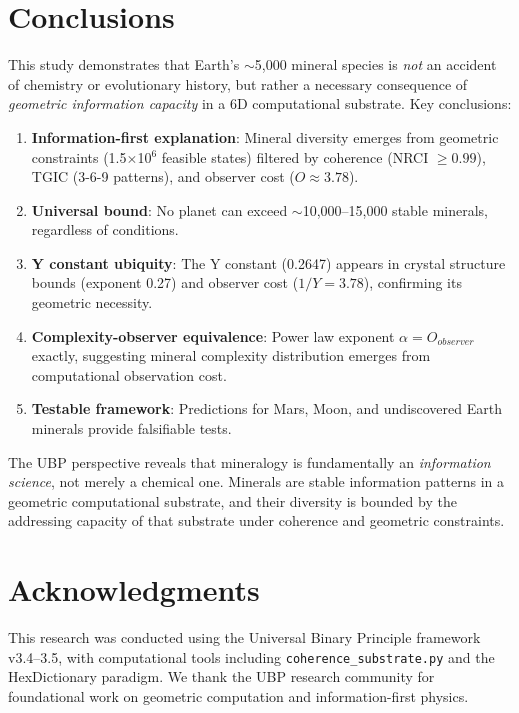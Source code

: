 \documentclass[11pt,a4paper]{article}
\begin{document}
\section{Conclusions}

This study demonstrates that Earth's $\sim$5,000 mineral species is \textit{not} an accident of chemistry or evolutionary history, but rather a necessary consequence of \textit{geometric information capacity} in a 6D computational substrate. Key conclusions:

\begin{enumerate}
\item \textbf{Information-first explanation}: Mineral diversity emerges from geometric constraints (1.5$\times$10$^6$ feasible states) filtered by coherence (NRCI $\geq 0.99$), TGIC (3-6-9 patterns), and observer cost ($O \approx 3.78$).

\item \textbf{Universal bound}: No planet can exceed $\sim$10,000--15,000 stable minerals, regardless of conditions.

\item \textbf{Y constant ubiquity}: The Y constant (0.2647) appears in crystal structure bounds (exponent 0.27) and observer cost ($1/Y = 3.78$), confirming its geometric necessity.

\item \textbf{Complexity-observer equivalence}: Power law exponent $\alpha = O_{observer}$ exactly, suggesting mineral complexity distribution emerges from computational observation cost.

\item \textbf{Testable framework}: Predictions for Mars, Moon, and undiscovered Earth minerals provide falsifiable tests.
\end{enumerate}

The UBP perspective reveals that mineralogy is fundamentally an \textit{information science}, not merely a chemical one. Minerals are stable information patterns in a geometric computational substrate, and their diversity is bounded by the addressing capacity of that substrate under coherence and geometric constraints.

\section*{Acknowledgments}

This research was conducted using the Universal Binary Principle framework v3.4--3.5, with computational tools including \texttt{coherence\_substrate.py} and the HexDictionary paradigm. We thank the UBP research community for foundational work on geometric computation and information-first physics.
\end{document}
